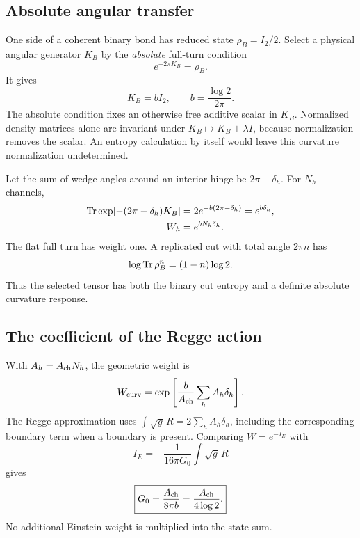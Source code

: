 \subsection{Absolute angular transfer}

One side of a coherent binary bond has reduced state $\rho_B=I_2/2$. Select a physical angular generator $K_B$ by the \emph{absolute} full-turn condition
\begin{equation}
e^{-2\pi K_B}=\rho_B.
\end{equation}
It gives
\begin{equation}
K_B=bI_2,\qquad b=\frac{\log2}{2\pi}.
\label{eq:angular}
\end{equation}
The absolute condition fixes an otherwise free additive scalar in $K_B$. Normalized density matrices alone are invariant under $K_B\mapsto K_B+\lambda I$, because normalization removes the scalar. An entropy calculation by itself would leave this curvature normalization undetermined.

Let the sum of wedge angles around an interior hinge be $2\pi-\delta_h$. For $N_h$ channels,
\begin{align}
\operatorname{Tr}\exp[-(2\pi-\delta_h)K_B]
&=2e^{-b(2\pi-\delta_h)}
=e^{b\delta_h},\\
W_h&=e^{bN_h\delta_h}.
\end{align}
The flat full turn has weight one. A replicated cut with total angle $2\pi n$ has
\begin{equation}
\log\operatorname{Tr}\rho_B^n=(1-n)\log2.
\end{equation}
Thus the selected tensor has both the binary cut entropy and a definite absolute curvature response.

\subsection{The coefficient of the Regge action}

With $A_h=A_{\rm ch} N_h$, the geometric weight is
\begin{equation}
W_{\rm curv}=\exp\left[\frac{b}{A_{\rm ch}}\sum_hA_h\delta_h\right].
\end{equation}
The Regge approximation uses $\int\sqrt g\,R=2\sum_hA_h\delta_h$, including the corresponding boundary term when a boundary is present. Comparing $W=e^{-I_E}$ with
\begin{equation}
I_E=-\frac1{16\pi G_0}\int\sqrt g\,R
\end{equation}
gives
\begin{equation}
\boxed{G_0=\frac{A_{\rm ch}}{8\pi b}=\frac{A_{\rm ch}}{4\log2}.}
\label{eq:G0}
\end{equation}
No additional Einstein weight is multiplied into the state sum.

